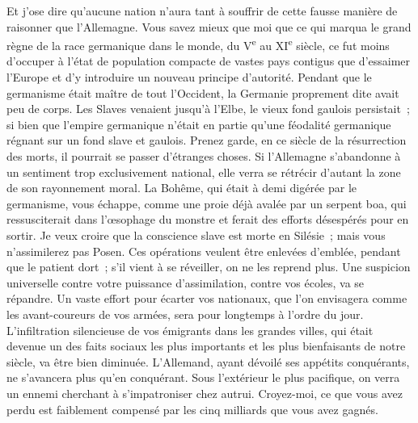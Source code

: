 \documentclass[french,twoside]{book} %
\begin{document}
Et j’ose dire qu’aucune nation n’aura tant à souffrir de cette fausse manière de raisonner que l’Allemagne. Vous savez mieux que moi que ce qui marqua le grand règne de la race germanique dans le monde, du V\textsuperscript{e} au XI\textsuperscript{e} siècle, ce fut moins d’occuper à l’état de population compacte de vastes pays contigus que d’essaimer l’Europe et d’y introduire un nouveau principe d’autorité. Pendant que le germanisme était maître de tout l’Occident, la Germanie proprement dite avait peu de corps. Les Slaves venaient jusqu’à l’Elbe, le vieux fond gaulois persistait ; si bien que l’empire germanique n’était en partie qu’une féodalité germanique régnant sur un fond slave et gaulois. Prenez garde, en ce siècle de la résurrection des morts, il pourrait se passer d’étranges choses. Si l’Allemagne s’abandonne à un sentiment trop exclusivement national, elle verra se rétrécir d’autant la zone de son rayonnement moral. La Bohême, qui était à demi digérée par le germanisme, vous échappe, comme une proie déjà avalée par un serpent boa, qui ressusciterait dans l’œsophage du monstre et ferait des efforts désespérés pour en sortir. Je veux croire que la conscience slave est morte en Silésie ; mais vous n’assimilerez pas Posen. Ces opérations veulent être enlevées d’emblée, pendant que le patient dort ; s’il vient à se réveiller, on ne les reprend plus. Une suspicion universelle contre votre puissance d’assimilation, contre vos écoles, va se répandre. Un vaste effort pour écarter vos nationaux, que l’on envisagera comme les avant-coureurs de vos armées, sera pour longtemps à l’ordre du jour. L’infiltration silencieuse de vos émigrants dans les grandes villes, qui était devenue un des faits sociaux les plus importants et les plus bienfaisants de notre siècle, va être bien diminuée. L’Allemand, ayant dévoilé ses appétits conquérants, ne s’avancera plus qu’en conquérant. Sous l’extérieur le plus pacifique, on verra un ennemi cherchant à s’impatroniser chez autrui. Croyez-moi, ce que vous avez perdu est faiblement compensé par les cinq milliards que vous avez gagnés.\par
\end{document}
